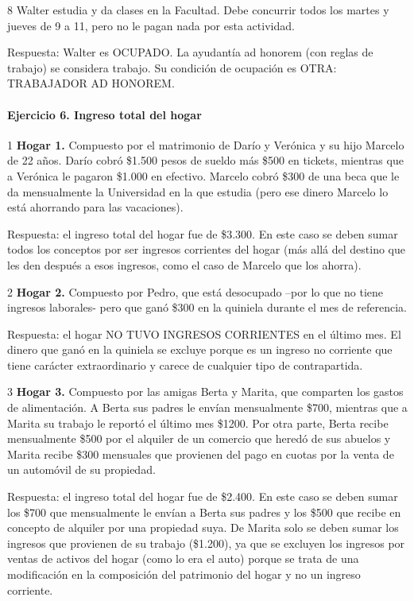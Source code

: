\documentclass[
  openany]{book}
\begin{document}
8 Walter estudia y da clases en la Facultad. Debe concurrir todos los martes y jueves de 9 a 11, pero no le pagan nada por esta actividad.

Respuesta: Walter es OCUPADO. La ayudantía ad honorem (con reglas de trabajo) se considera trabajo. Su condición de ocupación es OTRA: TRABAJADOR AD HONOREM.

\hypertarget{ejercicio-6.-ingreso-total-del-hogar-1}{%
\paragraph{Ejercicio 6. Ingreso total del hogar}\label{ejercicio-6.-ingreso-total-del-hogar-1}}

1 \textbf{Hogar 1.} Compuesto por el matrimonio de Darío y Verónica y su hijo Marcelo de 22 años. Darío cobró \$1.500 pesos de sueldo más \$500 en tickets, mientras que a Verónica le pagaron \$1.000 en efectivo. Marcelo cobró \$300 de una beca que le da mensualmente la Universidad en la que estudia (pero ese dinero Marcelo lo está ahorrando para las vacaciones).

Respuesta: el ingreso total del hogar fue de \$3.300. En este caso se deben sumar todos los conceptos por ser ingresos corrientes del hogar (más allá del destino que les den después a esos ingresos, como el caso de Marcelo que los ahorra).

2 \textbf{Hogar 2.} Compuesto por Pedro, que está desocupado --por lo que no tiene ingresos laborales- pero que ganó \$300 en la quiniela durante el mes de referencia.

Respuesta: el hogar NO TUVO INGRESOS CORRIENTES en el último mes. El dinero que ganó en la quiniela se excluye porque es un ingreso no corriente que tiene carácter extraordinario y carece de cualquier tipo de contrapartida.

3 \textbf{Hogar 3.} Compuesto por las amigas Berta y Marita, que comparten los gastos de alimentación. A Berta sus padres le envían mensualmente \$700, mientras que a Marita su trabajo le reportó el último mes \$1200. Por otra parte, Berta recibe mensualmente \$500 por el alquiler de un comercio que heredó de sus abuelos y Marita recibe \$300 mensuales que provienen del pago en cuotas por la venta de un automóvil de su propiedad.

Respuesta: el ingreso total del hogar fue de \$2.400. En este caso se deben sumar los \$700 que mensualmente le envían a Berta sus padres y los \$500 que recibe en concepto de alquiler por una propiedad suya. De Marita solo se deben sumar los ingresos que provienen de su trabajo (\$1.200), ya que se excluyen los ingresos por ventas de activos del hogar (como lo era el auto) porque se trata de una modificación en la composición del patrimonio del hogar y no un ingreso corriente.
\end{document}
